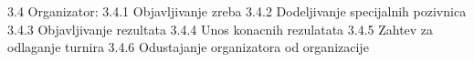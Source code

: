 3.4 Organizator:
      3.4.1 Objavljivanje zreba
      3.4.2 Dodeljivanje specijalnih pozivnica
      3.4.3 Objavljivanje rezultata
      3.4.4 Unos konacnih rezulatata
      3.4.5 Zahtev za odlaganje turnira
      3.4.6 Odustajanje organizatora od organizacije
